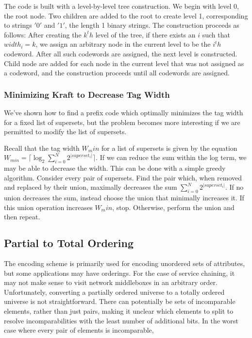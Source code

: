  The code is built with a level-by-level tree construction. We begin with level 0, the root node. Two children are added to the root to create level 1, corresponding to strings $'0'$ and $'1'$, the length 1 binary strings. The construction proceeds as follows:  After creating the $k^th$ level of the tree, if there exists an $i$ such that $width_i = k$, we assign an arbitrary node in the current level to be the $i^th$ codeword. After all such codewords are assigned, the next level is constructed. Child node are added for each node in the current level that was not assigned as a codeword, and the construction proceeds until all codewords are assigned.
 
\subsubsection{Minimizing Kraft to Decrease Tag Width}
We've shown how to find a prefix code which optimally minimizes the tag width for a fixed list of supersets, but the problem becomes more interesting if we are permitted to modify the list of supersets. 

Recall that the tag width $W_min$ for a list of supersets is given by the equation $W_{min} = \lceil\log_2{\sum_{i = 0}^{N}{2^{|superset_i|}}}\rceil$. If we can reduce the sum within the log term, we may be able to decrease the width. This can be done with a simple greedy algorithm. Consider every pair of supersets. Find the pair which, when removed and replaced by their union, maximally decreases the sum ${\sum_{i = 0}^{N}{2^{|superset_i|}}}$. If no union decreases the sum, instead choose the union that minimally increases it. If this union operation increases $W_min$, stop. Otherwise, perform the union and then repeat. 

\subsection{Partial to Total Ordering}
The encoding scheme is primarily used for encoding unordered sets of attributes, but some applications may have orderings. For the case of service chaining, it may not make sense to visit network middleboxes in an arbitrary order. 
Unfortunately, converting a partially ordered universe to a totally ordered universe is not straightforward. There can potentially be sets of incomparable elements, rather than just pairs, making it unclear which elements to split to resolve incomparabilities with the least number of additional bits. In the worst case where every pair of elements is incomparable, 

